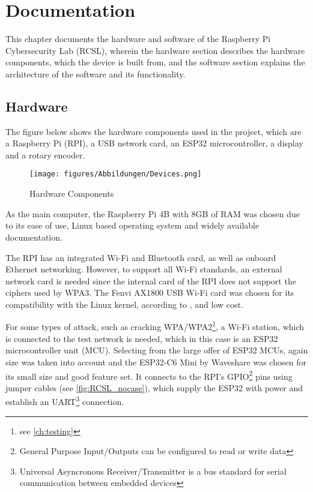 \chapter{Documentation}\label{ch:documentation}
\lstset{style=block}

This chapter documents the hardware and software of the Raspberry Pi Cybersecurity Lab (RCSL), wherein the hardware section describes the hardware components, which the device is built from, and the software section explains the architecture of the software and its functionality.

\section{Hardware}
The figure below shows the hardware components used in the project, which are a Raspberry Pi (RPI), a USB network card, an ESP32 microcontroller, a display and a rotary encoder.

\begin{figure}[h]
    \centering
    \texttt{[image: figures/Abbildungen/Devices.png]}
    \caption{Hardware Components}
    \label{fig:components}
\end{figure}

As the main computer, the Raspberry Pi 4B with 8GB of RAM was chosen due to its ease of use, Linux based operating system and widely available documentation. 

The RPI has an integrated Wi-Fi and Bluetooth card, as well as onboard Ethernet networking.
However, to support all Wi-Fi standards, an external network card is needed since the internal card of the RPI does not support the ciphers used by WPA3.
The Fenvi AX1800 USB Wi-Fi card was chosen for its compatibility with the Linux kernel, according to \cite{morrownr_USB_WiFi}, and low cost.

For some types of attack, such as cracking WPA/WPA2\footnote{see \cref{ch:testing}}, a Wi-Fi station, which is connected to the test network is needed, which in this case is an ESP32 microcontroller unit (MCU).
Selecting from the large offer of ESP32 MCUs, again size was taken into account and the ESP32-C6 Mini by Waveshare was chosen for its small size and good feature set.
It connects to the RPI's GPIO\footnote{General Purpose Input/Outputs can be configured to read or write data} pins using jumper cables (see \cref{fig:RCSL_nocase}), which supply the ESP32 with power and establish an UART\footnote{Universal Asyncronous Receiver/Transmitter is a bus standard for serial communication between embedded devices} connection.

